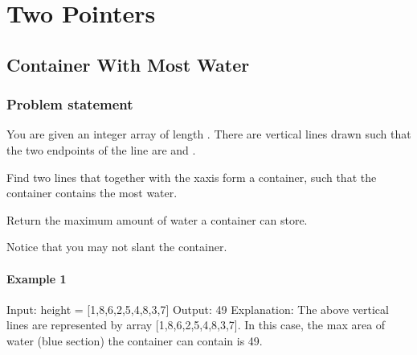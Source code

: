 \documentclass[letterpaper,12pt,english]{book}
\begin{document}
\sphinxstepscope


\chapter{Two Pointers}
\label{\detokenize{Two_Pointers/index:two-pointers}}\label{\detokenize{Two_Pointers/index::doc}}
\sphinxstepscope


\section{Container With Most Water}
\label{\detokenize{Two_Pointers/08_TP_11_Container_With_Most_Water:container-with-most-water}}\label{\detokenize{Two_Pointers/08_TP_11_Container_With_Most_Water::doc}}

\subsection{Problem statement\sphinxfootnotemark[106]}
\label{\detokenize{Two_Pointers/08_TP_11_Container_With_Most_Water:problem-statement}}%
\begin{footnotetext}[106]\sphinxAtStartFootnote
{}
%
\end{footnotetext}\ignorespaces 
\sphinxAtStartPar
You are given an integer array  of length . There are  vertical lines drawn such that the two endpoints of the  line are  and .

\sphinxAtStartPar
Find two lines that together with the x\sphinxhyphen{}axis form a container, such that the container contains the most water.

\sphinxAtStartPar
Return the maximum amount of water a container can store.

\sphinxAtStartPar
Notice that you may not slant the container.


\subsubsection{Example 1}
\label{\detokenize{Two_Pointers/08_TP_11_Container_With_Most_Water:example-1}}
\sphinxAtStartPar
{}

\begin{sphinxVerbatim}[commandchars=\\\{\}]
Input: height = [1,8,6,2,5,4,8,3,7]
Output: 49
Explanation: The above vertical lines are represented by array [1,8,6,2,5,4,8,3,7]. In this case, the max area of water (blue section) the container can contain is 49.
\end{sphinxVerbatim}
\end{document}
